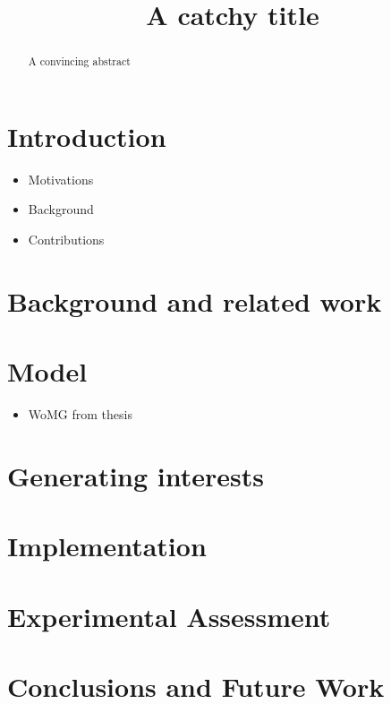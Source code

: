 \documentclass[sigconf,anonymous=true,draft]{acmart}
\begin{document}
\title{A catchy title}

\begin{abstract}
A convincing abstract
\end{abstract}
\maketitle \sloppy

\section{Introduction}
\label{sec:intro}


\begin{itemize}
  \item Motivations
  \item Background
  \item Contributions
\end{itemize}

\section{Background and related work}
\label{sec:related}


\section{Model}
\label{sec:model}


\begin{itemize}
  \item WoMG from thesis
\end{itemize}

\section{Generating interests}
\label{sec:interests}


\section{Implementation}
\label{sec:implementation}


\section{Experimental Assessment}
\label{sec:experiments}


\section{Conclusions and Future Work}
\label{sec:conclusions}




\end{document}
